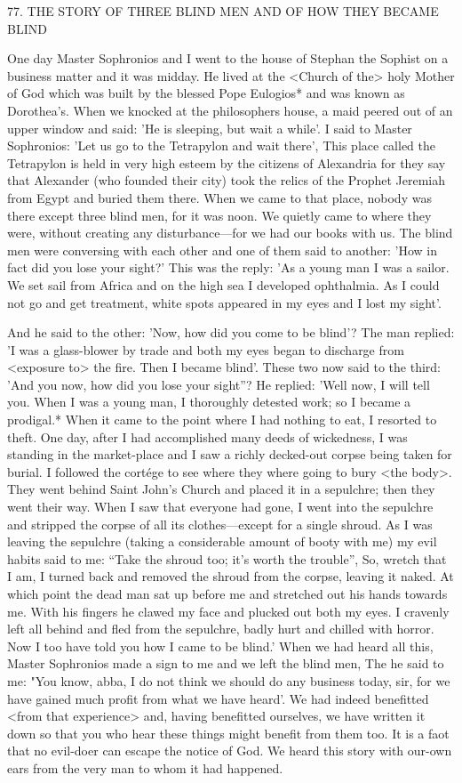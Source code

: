 77. THE STORY OF THREE BLIND MEN
AND OF HOW THEY BECAME BLIND

One day Master Sophronios and I went to the house of Stephan the
Sophist on a business matter and it was midday. He lived at the
<Church of the> holy Mother of God which was built by the
blessed Pope Eulogios* and was known as Dorothea's. When we
knocked at the philosopher\textquotesingle s house, a maid peered out of an upper
window and said: 'He is sleeping, but wait a while'. I said to Master
Sophronios: 'Let us go to the Tetrapylon and wait there', This place
called the Tetrapylon is held in very high esteem by the citizens of
Alexandria for they say that Alexander (who founded their city)
took the relics of the Prophet Jeremiah from Egypt and buried them
there. When we came to that place, nobody was there except three
blind men, for it was noon. We quietly came to where they were,
without creating any disturbance—for we had our books with us.
The blind men were conversing with each other and one of them
said to another: 'How in fact did you lose your sight?' This was the
reply: 'As a young man I was a sailor. We set sail from Africa and
on the high sea I developed ophthalmia. As I could not go and get
treatment, white spots appeared in my eyes and I lost my sight'.

And he said to the other: 'Now, how did you come to be blind'?
The man replied: 'I was a glass-blower by trade and both my eyes
began to discharge from <exposure to> the fire. Then I became
blind'. These two now said to the third: 'And you now, how did you
lose your sight”? He replied: 'Well now, I will tell you. When I was
a young man, I thoroughly detested work; so I became a prodigal.*
When it came to the point where I had nothing to eat, I resorted to
theft. One day, after I had accomplished many deeds of wickedness,
I was standing in the market-place and I saw a richly decked-out
corpse being taken for burial. I followed the cortége to see where
they where going to bury <the body>. They went behind Saint
John's Church and placed it in a sepulchre; then they went their
way. When I saw that everyone had gone, I went into the sepulchre
and stripped the corpse of all its clothes—except for a single shroud.
As I was leaving the sepulchre (taking a considerable amount of
booty with me) my evil habits said to me: “Take the shroud too; it's
worth the trouble”, So, wretch that I am, I turned back and
removed the shroud from the corpse, leaving it naked. At which
point the dead man sat up before me and stretched out his hands
towards me. With his fingers he clawed my face and plucked out
both my eyes. I cravenly left all behind and fled from the sepulchre,
badly hurt and chilled with horror. Now I too have told you how
I came to be blind.' When we had heard all this, Master Sophronios
made a sign to me and we left the blind men, The he said to me:
"You know, abba, I do not think we should do any business today,
sir, for we have gained much profit from what we have heard'. We
had indeed benefitted <from that experience> and, having benefitted
ourselves, we have written it down so that you who hear these
things might benefit from them too. It is a faot that no evil-doer can
escape the notice of God. We heard this story with our-own ears
from the very man to whom it had happened.

